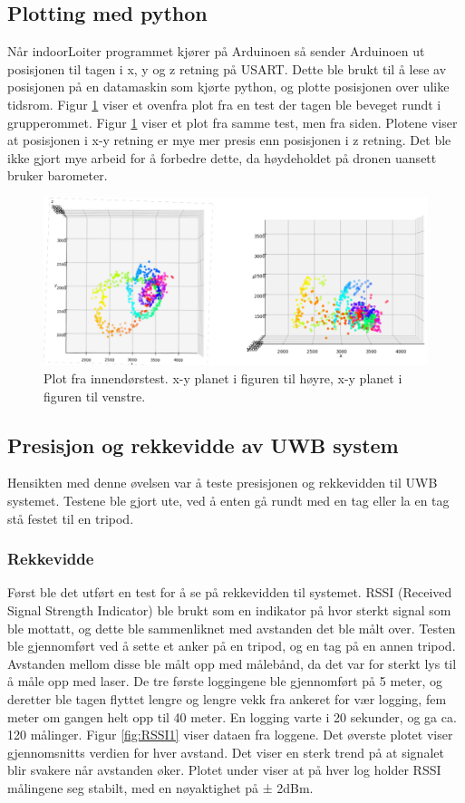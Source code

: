 \subsection{Plotting med python}
Når indoorLoiter programmet kjører på Arduinoen så sender Arduinoen ut posisjonen til tagen i x, y og z retning på USART. 
Dette ble brukt til å lese av posisjonen på en datamaskin som kjørte python, og plotte posisjonen over ulike tidsrom.
Figur \ref{fig:ovenfra} viser et ovenfra plot fra en test der tagen ble beveget rundt i grupperommet. 
Figur \ref{fig:ovenfra} viser et plot fra samme test, men fra siden. 
Plotene viser at posisjonen i x-y retning er mye mer presis enn posisjonen i z retning. 
Det ble ikke gjort mye arbeid for å forbedre dette, da høydeholdet på dronen uansett bruker barometer.

\begin{figure}[htp]
\centering
\includegraphics[width=0.5\columnwidth]{figures/plott-ovenfra}
\caption{Plot fra innendørstest. x-y planet i figuren til høyre, x-y planet i figuren til venstre.}
\label{fig:ovenfra}
\end{figure}

\subsection{Presisjon og rekkevidde av UWB system}
Hensikten med denne øvelsen var å teste presisjonen og rekkevidden til UWB systemet. 
Testene ble gjort ute, ved å enten gå rundt med en tag eller la en tag stå festet til en tripod.

\subsubsection{Rekkevidde}
Først ble det utført en test for å se på rekkevidden til systemet. 
RSSI (Received Signal Strength Indicator) ble brukt som en indikator på hvor sterkt signal som ble mottatt, 
og dette ble sammenliknet med avstanden det ble målt over. 
Testen ble gjennomført ved å sette et anker på en tripod, og en tag på en annen tripod. Avstanden mellom disse ble målt opp med målebånd, 
da det var for sterkt lys til å måle opp med laser. De tre første loggingene ble gjennomført på 5 meter, 
og deretter ble tagen flyttet lengre og lengre vekk fra ankeret for vær logging, fem meter om gangen helt opp til 40 meter. 
En logging varte i 20 sekunder, og ga ca. 120 målinger. Figur \ref{fig:RSSI1} viser dataen fra loggene. 
Det øverste plotet viser gjennomsnitts verdien for hver avstand. Det viser en sterk trend på at signalet blir 
svakere når avstanden øker. Plotet under viser at på hver log holder RSSI målingene seg stabilt, med en nøyaktighet på ± 2dBm.

